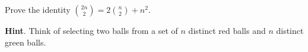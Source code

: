 \documentclass{book}
\begin{document}
\setcounter{cpjt}{94}
\addtocounter{cpjt}{-1}
\begin{activity}\label{act-redgreenballs}
\hypertarget{p-676}{}%
Prove the identity \(\binom{2n}{2} = 2 \binom{n}{2} + n^{2}\).%
\par\smallskip%
\noindent\textbf{Hint}.\hypertarget{hint-48}{}\quad%
\hypertarget{p-677}{}%
Think of selecting two balls from a set of \(n\) distinct red balls and \(n\) distinct green balls.%
\par\smallskip%
\noindent\end{activity}

\clearpage
\end{document}
